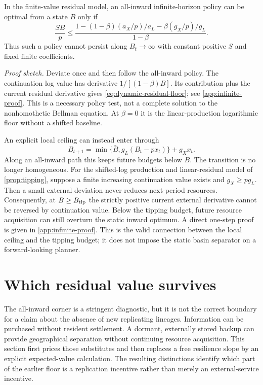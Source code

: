 \begin{corollary}
\label{cor:dynamic-residual}
In the finite-value residual model, an all-inward infinite-horizon policy
can be optimal from a state $B$ only if
\begin{equation}
 \frac{SB}{p}\leq
 \frac{1-(1-\beta)(a_X/p)/a_L-\beta(g_X/p)/g_L}{1-\beta}.
 \label{eq:dynamic-residual-floor}
\end{equation}
Thus such a policy cannot persist along $B_t\to\infty$ with constant
positive $S$ and fixed finite coefficients.
\end{corollary}
\noindent\emph{Proof sketch.}
Deviate once and then follow the all-inward policy. The continuation log
value has derivative $1/[(1-\beta)B]$. Its contribution plus the current
residual derivative gives \cref{eq:dynamic-residual-floor}; see
\cref{app:infinite-proof}. This is a necessary policy test, not a complete
solution to the nonhomothetic Bellman equation. At $\beta=0$ it is the
linear-production logarithmic floor without a shifted baseline.

An explicit local ceiling can instead enter through
\begin{equation}
 B_{t+1}=\min\{\bar B,g_L(B_t-px_t)\}+g_Xx_t.
 \label{eq:capped-transition}
\end{equation}
Along an all-inward path this keeps future budgets below $\bar B$.
The transition is no longer homogeneous. For the shifted-log production
and linear-residual model of \cref{prop:tipping}, suppose a finite
increasing continuation value exists and $g_X\geq pg_L$. Then a small
external deviation never reduces next-period resources. Consequently,
at $B\geq B_{\rm tip}$ the strictly positive current external derivative
cannot be reversed by continuation value. Below the tipping budget,
future resource acquisition can still overturn the static inward optimum.
A direct one-step proof is given in \cref{app:infinite-proof}.
This is the valid connection between the local ceiling and the tipping
budget; it does not impose the static basin separator on a forward-looking
planner.

\section{Which residual value survives}
\label{sec:residual}

The all-inward corner is a stringent diagnostic, but it is not the correct
boundary for a claim about the absence of new replicating lineages.
Information can be purchased without resident settlement. A dormant,
externally stored backup can provide geographical separation without
continuing resource acquisition. This section first prices those substitutes
and then replaces a free resilience slope by an explicit expected-value
calculation. The resulting distinctions identify which part of the earlier
floor is a replication incentive rather than merely an external-service
incentive.

